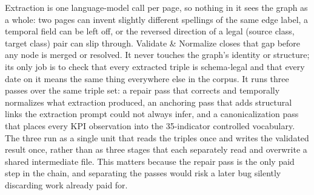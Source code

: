 \documentclass[fontsize=12pt,oneside,headings=small]{scrreprt}
\begin{document}
Extraction is one language-model call per page, so nothing in it sees the graph as a whole: two pages can invent slightly different spellings of the same edge label, a temporal field can be left off, or the reversed direction of a legal (source class, target class) pair can slip through. Validate \& Normalize closes that gap before any node is merged or resolved. It never touches the graph's identity or structure; its only job is to check that every extracted triple is schema-legal and that every date on it means the same thing everywhere else in the corpus. It runs three passes over the same triple set: a repair pass that corrects and temporally normalizes what extraction produced, an anchoring pass that adds structural links the extraction prompt could not always infer, and a canonicalization pass that places every KPI observation into the 35-indicator controlled vocabulary. The three run as a single unit that reads the triples once and writes the validated result once, rather than as three stages that each separately read and overwrite a shared intermediate file. This matters because the repair pass is the only paid step in the chain, and separating the passes would risk a later bug silently discarding work already paid for.
\end{document}
